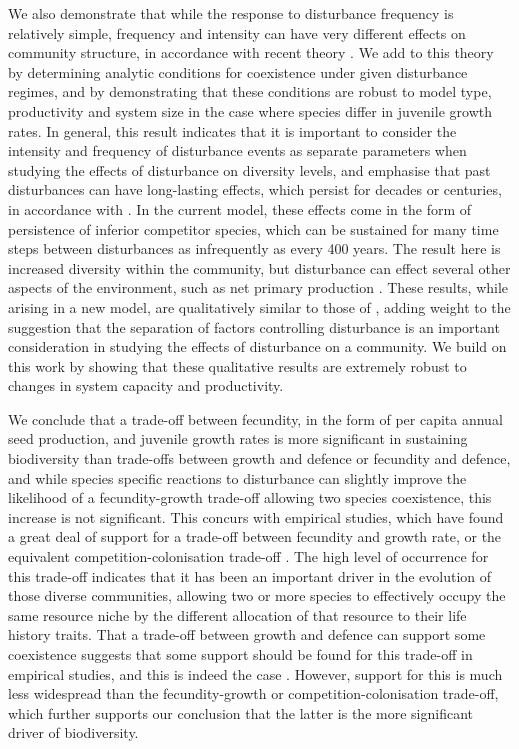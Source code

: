 \documentclass[a4paper]{article}
\begin{document}
We also demonstrate that while the response to disturbance frequency is relatively simple, frequency and intensity can have very different effects on community structure, in accordance with recent theory \citep{miller2011frequency}. We add to this theory by determining analytic conditions for coexistence under given disturbance regimes, and by demonstrating that these conditions are robust to model type, productivity and system size in the case where species differ in juvenile growth rates. In general, this result indicates that it is important to consider the intensity and frequency of disturbance events as separate parameters when studying the effects of disturbance on diversity levels, and emphasise that past disturbances can have long-lasting effects, which persist for decades or centuries, in accordance with \cite{foster1999human}. In the current model, these effects come in the form of persistence of inferior competitor species, which can be sustained for many time steps between disturbances as infrequently as every 400 years. The result here is increased diversity within the community, but disturbance can effect several other aspects of the environment, such as net primary production \citep[e.g.][]{turner2010disturbance}. These results, while arising in a new model, are qualitatively similar to those of \cite{miller2011frequency}, adding weight to the suggestion that the separation of factors controlling disturbance is an important consideration in studying the effects of disturbance on a community. We build on this work by showing that these qualitative results are extremely robust to changes in system capacity and productivity.

We conclude that a trade-off between fecundity, in the form of per capita annual seed production, and juvenile growth rates is more significant in sustaining biodiversity than trade-offs between growth and defence or fecundity and defence, and while species specific reactions to disturbance can slightly improve the likelihood of a fecundity-growth trade-off allowing two species coexistence, this increase is not significant. This concurs with empirical studies, which have found a great deal of support for a trade-off between fecundity and growth rate, or the equivalent competition-colonisation trade-off \citep[e.g.][]{levins1971regional,yu2001competition,tilman1994competition,adler2000space}. The high level of occurrence for this trade-off indicates that it has been an important driver in the evolution of those diverse communities, allowing two or more species to effectively occupy the same resource niche by the different allocation of that resource to their life history traits. That a trade-off between growth and defence can support some coexistence suggests that some support should be found for this trade-off in empirical studies, and this is indeed the case \citep[e.g.][]{wright2010functional,fine2006growth}. However, support for this is much less widespread than the fecundity-growth or competition-colonisation trade-off, which further supports our conclusion that the latter is the more significant driver of biodiversity.
\end{document}
